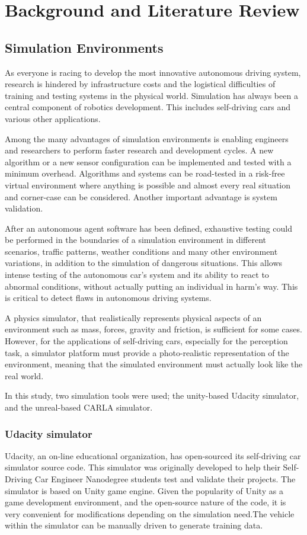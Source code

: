 \chapter{Background and Literature Review}\label{chap:background}
\section{Simulation Environments}

As everyone is racing to develop the most innovative autonomous driving system, research is hindered by infrastructure costs and the logistical difficulties of training and testing systems in the physical world. Simulation has always been a central component of robotics development. This includes self-driving cars and various other applications. 

Among the many advantages of simulation environments is enabling engineers and researchers to perform faster research and development cycles. A new algorithm or a new sensor configuration can be implemented and tested with a minimum overhead. Algorithms and systems can be road-tested in a risk-free virtual environment where anything is possible and almost every real situation and corner-case can be considered. Another important advantage is system validation. 

After an autonomous agent software has been defined, exhaustive testing could be performed in the boundaries of a simulation environment in different scenarios, traffic patterns, weather conditions and many other environment variations, in addition to the simulation of dangerous situations. This allows intense testing of the autonomous car's system and its ability to react to abnormal conditions, without actually putting an individual in harm's way. This is critical to detect flaws in autonomous driving systems.

A physics simulator, that realistically represents physical aspects of an environment such as mass, forces, gravity and friction, is sufficient for some cases. However, for the applications of self-driving cars, especially for the perception task, a simulator platform must provide a photo-realistic representation of the environment, meaning that the simulated environment must actually look like the real world.

In this study, two simulation tools were used; the unity-based Udacity simulator, and the unreal-based CARLA simulator.
\pagebreak
\subsection{Udacity simulator}
Udacity, an on-line educational organization, has open-sourced its self-driving car simulator source code. This simulator was originally developed to help their Self-Driving Car Engineer Nanodegree students test and validate their projects. The simulator is based on Unity game engine. Given the popularity of Unity as a game development environment, and the open-source nature of the code, it is very convenient for modifications depending on the simulation need.The vehicle within the simulator can be manually driven to generate training data. 

